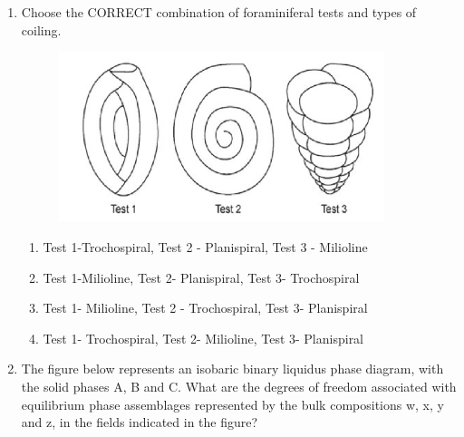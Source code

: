 \documentclass[journal,12pt,onecolumn]{IEEEtran}
\begin{document}
\begin{enumerate}
\item Choose the CORRECT combination of foraminiferal tests and types of coiling.

\hfill{}
\begin{figure}[h!]
    \centering
    \includegraphics[width=0.9\textwidth]{figs/fig9.png}
    \caption{}
    \label{fig:partB_geo_q8}
\end{figure}
\begin{enumerate}
    \item Test 1-Trochospiral, Test 2 - Planispiral, Test 3 - Milioline
    \item Test 1-Milioline, Test 2- Planispiral, Test 3- Trochospiral
    \item Test 1- Milioline, Test 2 - Trochospiral, Test 3- Planispiral
    \item Test 1- Trochospiral, Test 2- Milioline, Test 3- Planispiral
\end{enumerate}

\item The figure below represents an isobaric binary liquidus phase diagram, with the solid phases A, B and C. What are the degrees of freedom associated with equilibrium phase assemblages represented by the bulk compositions w, x, y and z, in the fields indicated in the figure?


\end{enumerate}
\end{document}
